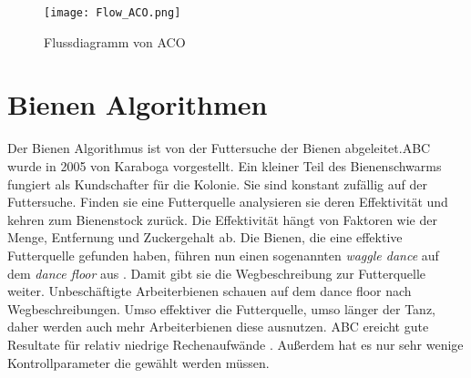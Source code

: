 \begin{figure}
  \centering
  \texttt{[image: Flow\_ACO.png]}
  \caption{Flussdiagramm von ACO}
  \label{fig:Figure_ACO}
\end{figure}

\section{Bienen Algorithmen}
Der Bienen Algorithmus ist von der Futtersuche der Bienen abgeleitet.ABC wurde in 2005 von Karaboga vorgestellt\cite{karaboga2005idea}. Ein kleiner Teil des Bienenschwarms fungiert als Kundschafter für die Kolonie.
Sie sind konstant zufällig auf der Futtersuche. Finden sie eine Futterquelle analysieren sie deren Effektivität und kehren zum Bienenstock zurück. Die Effektivität hängt von Faktoren wie der Menge, Entfernung und Zuckergehalt ab.\cite{PHAM2006454}
Die Bienen, die eine effektive Futterquelle gefunden haben, führen nun einen sogenannten \emph{waggle dance} auf dem \emph{dance floor} aus \cite{Seeley+1995}. Damit gibt sie die Wegbeschreibung zur Futterquelle weiter.
Unbeschäftigte Arbeiterbienen schauen auf dem dance floor nach Wegbeschreibungen. Umso effektiver die Futterquelle, umso länger der Tanz, daher werden auch mehr Arbeiterbienen diese ausnutzen.\cite{KARABOGA2009108} ABC ereicht gute Resultate für relativ niedrige Rechenaufwände \cite{karaboga2008performance}. Außerdem hat es nur sehr wenige Kontrollparameter die gewählt werden müssen.\\

